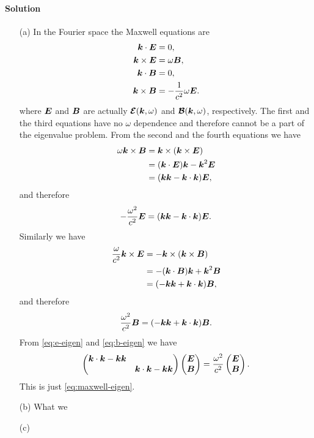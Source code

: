 \documentclass[hyperref, a4paper]{article}
\begin{document}
\paragraph{Solution} \begin{itemize}
\item[(a)] In the Fourier space the Maxwell equations are 
\[
    \begin{aligned}
        \vb*{k} \cdot \vb*{E} &= 0, \\ 
        \vb*{k} \times \vb*{E} &= \omega \vb*{B}, \\
        \vb*{k} \cdot \vb*{B} &= 0, \\
        \vb*{k} \times \vb*{B} &= - \frac{1}{c^2} \omega \vb*{E}.
    \end{aligned}
\]
where $\vb*{E}$ and $\vb*{B}$ are actually $\vb*{\mathcal{E}}(\vb*{k}, \omega)$ 
and $\vb*{\mathcal{B}}(\vb*{k}, \omega)$, respectively. The first and the third equations have 
no $\omega$ dependence and therefore cannot be a part of the eigenvalue problem. 
From the second and the fourth equations we have 
\[
    \begin{aligned}
        \omega \vb*{k} \times \vb*{B} &= \vb*{k} \times (\vb*{k} \times \vb*{E}) \\
        &= (\vb*{k} \cdot \vb*{E}) \vb*{k} - \vb*{k}^2 \vb*{E} \\
        &= (\vb*{k} \vb*{k} - \vb*{k} \cdot \vb*{k}) \vb*{E},
    \end{aligned}
\]
and therefore 
\begin{equation}
    - \frac{\omega^2}{c^2} \vb*{E} = (\vb*{k} \vb*{k} - \vb*{k} \cdot \vb*{k}) \vb*{E}.
    \label{eq:e-eigen}
\end{equation}
Similarly we have 
\[
    \begin{aligned}
        \frac{\omega}{c^2} \vb*{k} \times \vb*{E} &= - \vb*{k} \times (\vb*{k} \times \vb*{B}) \\
        &= - (\vb*{k} \cdot \vb*{B}) \vb*{k} + \vb*{k}^2 \vb*{B} \\
        &= (- \vb*{k} \vb*{k} + \vb*{k} \cdot \vb*{k}) \vb*{B}, 
    \end{aligned}
\]
and therefore 
\begin{equation}
    \frac{\omega^2}{c^2} \vb*{B} = (- \vb*{k} \vb*{k} + \vb*{k} \cdot \vb*{k}) \vb*{B}.
    \label{eq:b-eigen}
\end{equation}
From \eqref{eq:e-eigen} and \eqref{eq:b-eigen} we have 
\begin{equation}
    \pmqty{\dmat{ \vb*{k} \cdot \vb*{k} - \vb*{k} \vb*{k} , \vb*{k} \cdot \vb*{k} - \vb*{k} \vb*{k} }} 
    \pmqty{\vb*{E} \\ \vb*{B}} = \frac{\omega^2}{c^2} \pmqty{\vb*{E} \\ \vb*{B}}. 
\end{equation}
This is just \eqref{eq:maxwell-eigen}.

\item[(b)] What we 

\item[(c)] 
\end{itemize}
\end{document}
